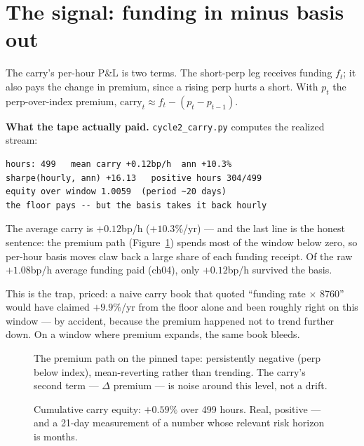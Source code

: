 \section{The signal: funding in minus basis out}\label{sec:signal18}

The carry's per-hour P\&L is two terms. The short-perp leg
receives funding $f_t$; it also pays the change in premium,
since a rising perp hurts a short. With $p_t$ the
perp-over-index premium, $\mathrm{carry}_t \approx f_t -
(p_t - p_{t-1})$.

\begin{example}\label{ex:carry18}
\textbf{What the tape actually paid.}
\texttt{cycle2\_carry.py} computes the realized stream:
\begin{verbatim}
hours: 499   mean carry +0.12bp/h  ann +10.3%
sharpe(hourly, ann) +16.13   positive hours 304/499
equity over window 1.0059  (period ~20 days)
the floor pays -- but the basis takes it back hourly
\end{verbatim}
The average carry is $+0.12$bp/h ($+10.3\%$/yr) --- and the
last line is the honest sentence: the premium path
(Figure~\ref{fig:prempath}) spends most of the window below
zero, so per-hour basis moves claw back a large share of each
funding receipt. Of the raw $+1.08$bp/h average funding
paid (ch04), only $+0.12$bp/h survived the basis.
\begin{solution}
This is the trap, priced: a naive carry book that quoted
``funding rate $\times$ 8760'' would have claimed $+9.9\%$/yr
from the floor alone and been roughly right on this window ---
by accident, because the premium happened not to trend further
down. On a window where premium expands, the same book bleeds.
\end{solution}
\end{example}

\begin{figure}[htbp]\centering

\caption{The premium path on the pinned tape: persistently
negative (perp below index), mean-reverting rather than
trending. The carry's second term --- $\Delta$ premium --- is
noise around this level, not a drift.}
\label{fig:prempath}
\end{figure}

\begin{figure}[htbp]\centering

\caption{Cumulative carry equity: $+0.59\%$ over 499 hours.
Real, positive --- and a 21-day measurement of a number whose
relevant risk horizon is months.}
\label{fig:carryeq}
\end{figure}

